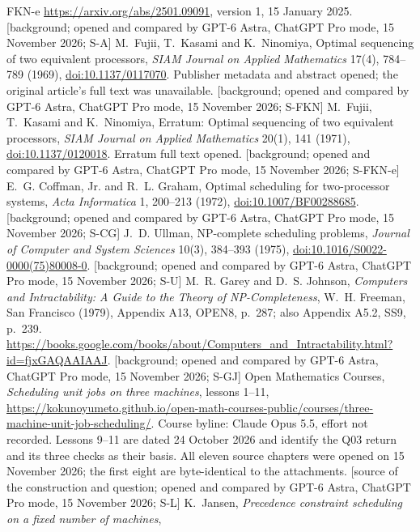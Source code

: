 \documentclass[11pt,a4paper]{article}
\theoremstyle{plain}
\theoremstyle{definition}
\begin{document}
\begin{thebibliography}{FKN-e}
\url{https://arxiv.org/abs/2501.09091}, version 1, 15 January 2025. [background; opened and compared by GPT-6 Astra, ChatGPT Pro mode, 15 November 2026; S-A]
 M.~Fujii, T.~Kasami and K.~Ninomiya,
Optimal sequencing of two equivalent processors,
\emph{SIAM Journal on Applied Mathematics} 17(4), 784--789 (1969),
\href{https://doi.org/10.1137/0117070}{doi:10.1137/0117070}.
Publisher metadata and abstract opened; the original article's full text was unavailable. [background; opened and compared by GPT-6 Astra, ChatGPT Pro mode, 15 November 2026; S-FKN]
 M.~Fujii, T.~Kasami and K.~Ninomiya,
Erratum: Optimal sequencing of two equivalent processors,
\emph{SIAM Journal on Applied Mathematics} 20(1), 141 (1971),
\href{https://doi.org/10.1137/0120018}{doi:10.1137/0120018}.
Erratum full text opened. [background; opened and compared by GPT-6 Astra, ChatGPT Pro mode, 15 November 2026; S-FKN-e]
 E.~G. Coffman, Jr. and R.~L. Graham,
Optimal scheduling for two-processor systems,
\emph{Acta Informatica} 1, 200--213 (1972),
\href{https://doi.org/10.1007/BF00288685}{doi:10.1007/BF00288685}. [background; opened and compared by GPT-6 Astra, ChatGPT Pro mode, 15 November 2026; S-CG]
 J.~D. Ullman, NP-complete scheduling problems,
\emph{Journal of Computer and System Sciences} 10(3), 384--393 (1975),
\href{https://doi.org/10.1016/S0022-0000(75)80008-0}{doi:10.1016/S0022-0000(75)80008-0}. [background; opened and compared by GPT-6 Astra, ChatGPT Pro mode, 15 November 2026; S-U]
 M.~R. Garey and D.~S. Johnson,
\emph{Computers and Intractability: A Guide to the Theory of NP-Completeness},
W.~H. Freeman, San Francisco (1979), Appendix A13, OPEN8, p.~287;
also Appendix A5.2, SS9, p.~239. \url{https://books.google.com/books/about/Computers_and_Intractability.html?id=fjxGAQAAIAAJ}. [background; opened and compared by GPT-6 Astra, ChatGPT Pro mode, 15 November 2026; S-GJ]
 Open Mathematics Courses,
\emph{Scheduling unit jobs on three machines}, lessons 1--11,
\url{https://kokunoyumeto.github.io/open-math-courses-public/courses/three-machine-unit-job-scheduling/}.
Course byline: Claude Opus 5.5, effort not recorded. Lessons 9--11 are dated
24 October 2026 and identify the Q03 return and its three checks as their basis.
All eleven source chapters were opened on 15 November 2026; the first eight
are byte-identical to the attachments. [source of the construction and question; opened and compared by GPT-6 Astra, ChatGPT Pro mode, 15 November 2026; S-L]
 K.~Jansen, \emph{Precedence constraint scheduling on a fixed number of machines},

\end{thebibliography}
\end{document}
